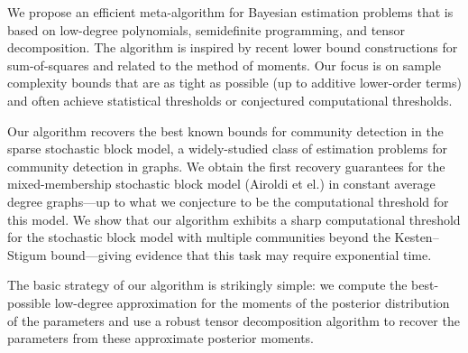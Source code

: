 We propose an efficient meta-algorithm for Bayesian estimation problems that is based on low-degree polynomials, semidefinite programming, and tensor decomposition.
The algorithm is inspired by recent lower bound constructions for sum-of-squares and related to the method of moments.
Our focus is on sample complexity bounds that are as tight as possible (up to additive lower-order terms) and often achieve statistical thresholds or conjectured computational thresholds.

Our algorithm recovers the best known bounds for community detection in the sparse stochastic block model, a widely-studied class of estimation problems for community detection in graphs.
We obtain the first recovery guarantees for the mixed-membership stochastic block model (Airoldi et el.) in constant average degree graphs---up to what we conjecture to be the computational threshold for this model.
%
We show that our algorithm exhibits a sharp computational threshold for the stochastic block model with multiple communities beyond the Kesten--Stigum bound---giving evidence that this task may require exponential time.

The basic strategy of our algorithm is strikingly simple:
we compute the best-possible low-degree approximation for the moments of the posterior distribution of the parameters and use a robust tensor decomposition algorithm to recover the parameters from these approximate posterior moments.

%
%